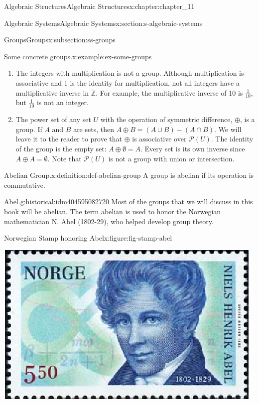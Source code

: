 \documentclass[twoside,10pt,]{book}
\numberwithin{equation}{section}
\begin{document}
\begin{chapterptx}{Algebraic Structures}{}{Algebraic Structures}{}{}{x:chapter:chapter_11}
\begin{sectionptx}{Algebraic Systems}{}{Algebraic Systems}{}{}{x:section:s-algebraic-systems}
\begin{subsectionptx}{Groups}{}{Groups}{}{}{x:subsection:ss-groups}
\begin{example}{Some concrete groups.}{x:example:ex-some-groups}
\begin{enumerate}[label=(\alph*)]
\item{}The integers with multiplication is not a group. Although multiplication is associative and 1 is the identity for multiplication, not all integers have a multiplicative inverse in \(\mathbb{Z}\).  For example, the multiplicative inverse of 10 is \(\frac{1}{10}\), but \(\frac{1}{10}\) is not an integer.%
\item{}The power set of any set \(U\) with the operation of symmetric difference, \(\oplus\), is a group. If \(A\) and \(B\) are sets, then \(A\oplus B=(A\cup B)-(A\cap B)\). We will leave it to the reader to prove that \(\oplus\) is associative over \(\mathcal{P}(U)\). The identity of the group is the empty set: \(A\oplus  \emptyset  = A\). Every set is its own inverse since \(A \oplus  A = \emptyset\). Note that \(\mathcal{P}(U)\) is not a group with union or intersection.%
\end{enumerate}
%
\end{example}
\begin{definition}{Abelian Group.}{x:definition:def-abelian-group}%
%
A group is abelian if its operation is commutative.%
\end{definition}
\begin{historical}{Abel.}{g:historical:idm404595082720}%
Most of the groups that we will discuss in this book will be abelian. The term abelian is used to honor the Norwegian mathematician N. Abel (1802-29), who helped develop group theory.%
\end{historical}
\begin{figureptx}{Norwegian Stamp honoring Abel}{x:figure:fig-stamp-abel}{}%
\begin{image}{0.2}{0.6}{0.2}%
\includegraphics[width=\linewidth]{images/fig-stamp-abel.png}
\end{image}%

\end{figureptx}
\end{subsectionptx}
\end{sectionptx}
\end{chapterptx}
\end{document}
